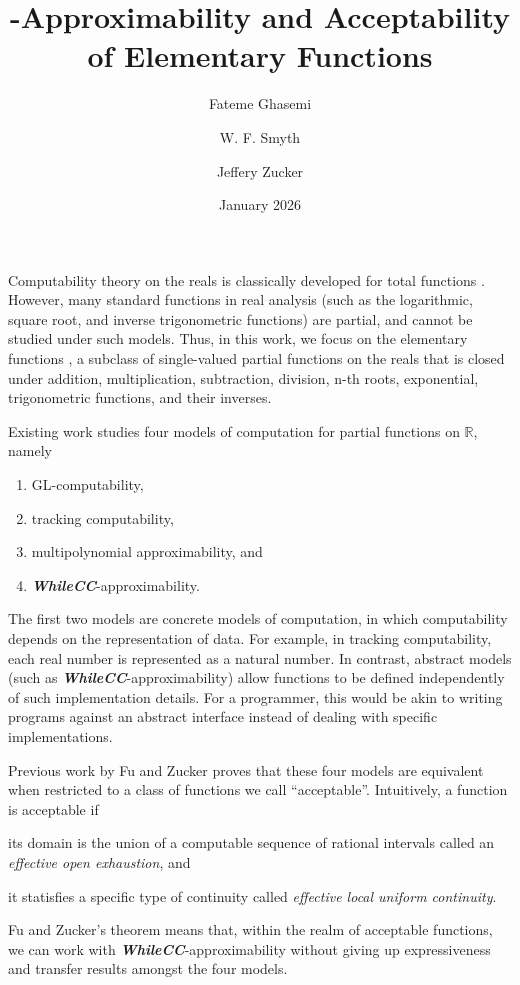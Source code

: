 \documentclass{article}
\title{\WhileCC-Approximability and Acceptability of Elementary Functions}
\author[ ]{Fateme Ghasemi}
\author[ ]{W. F. Smyth}
\author[ ]{Jeffery Zucker}
\affil[ ]{Department of Computing and Software, McMaster University, Hamilton, ON, Canada}
\affil[ ]{\{ghases5, smyth, zucker\}@mcmaster.ca}
\date{January 2026}
\newcommand\WhileCC{\textit{\textbf{WhileCC}}}
\newcommand\Reals{\mathbb{R}}
\begin{document}
\maketitle

Computability theory on the reals is classically  developed for total functions \cite{ConcreteModelsTopologicalAlgebra_Tucker1999,ComputableTotalFunctionsOnMetricAlgebras_JohnTuckerAndJeffZucker}.
However, many standard functions in real analysis (such as the logarithmic, square root, and inverse trigonometric functions) are partial, and cannot be studied under such models.
Thus, in this work, we focus on the elementary functions \cite{OrdinaryDifferentialEquations_Morris_Tenenbaum_1985},
a subclass of single-valued partial functions on the reals
that is closed under
addition, multiplication, subtraction, division, n-th roots,
exponential, trigonometric functions, and their inverses.


Existing work \cite{ModelOfCompForPartFunc_MingQuanFuAndJeffZucker,ComputationByWhileProgramsOnTopologicalPartialAlgebras_TuckerAndZucker,AbstractVSConcreteComputationOnMetricPartialAlgebras_TuckerZucker_2004} studies four models of computation for partial functions on $\Reals$, namely
\begin{enumerate}[itemsep=1pt, parsep=2pt, topsep=0pt, partopsep=0pt]
    \item GL-computability,
    \item tracking computability,
    \item multipolynomial
          approximability, and
    \item \WhileCC-approximability.
\end{enumerate}
The first two models are concrete models of computation, in which computability depends on the representation of data.
For example, in tracking computability, each real number is represented as a natural number.
In contrast, abstract models (such as \WhileCC-approximability) allow functions to be defined independently of such implementation details.
For a programmer, this would be akin to writing programs against an abstract interface instead of dealing with specific implementations.

Previous work by Fu and Zucker \cite{ModelOfCompForPartFunc_MingQuanFuAndJeffZucker} proves that these four models are equivalent when restricted to a class of functions we call ``acceptable''.
Intuitively, a function is acceptable if
\begin{enumerate*}[label=(\arabic*)]
    \item
          its domain is the union of a computable sequence of rational intervals called an \emph{effective open exhaustion}, and
    \item it statisfies a specific type of continuity called \emph{effective local uniform continuity}.
\end{enumerate*}
Fu and Zucker's theorem means that, within the realm of acceptable functions, we can work with \WhileCC-approximability without giving up expressiveness and transfer results amongst the four models.
\end{document}
